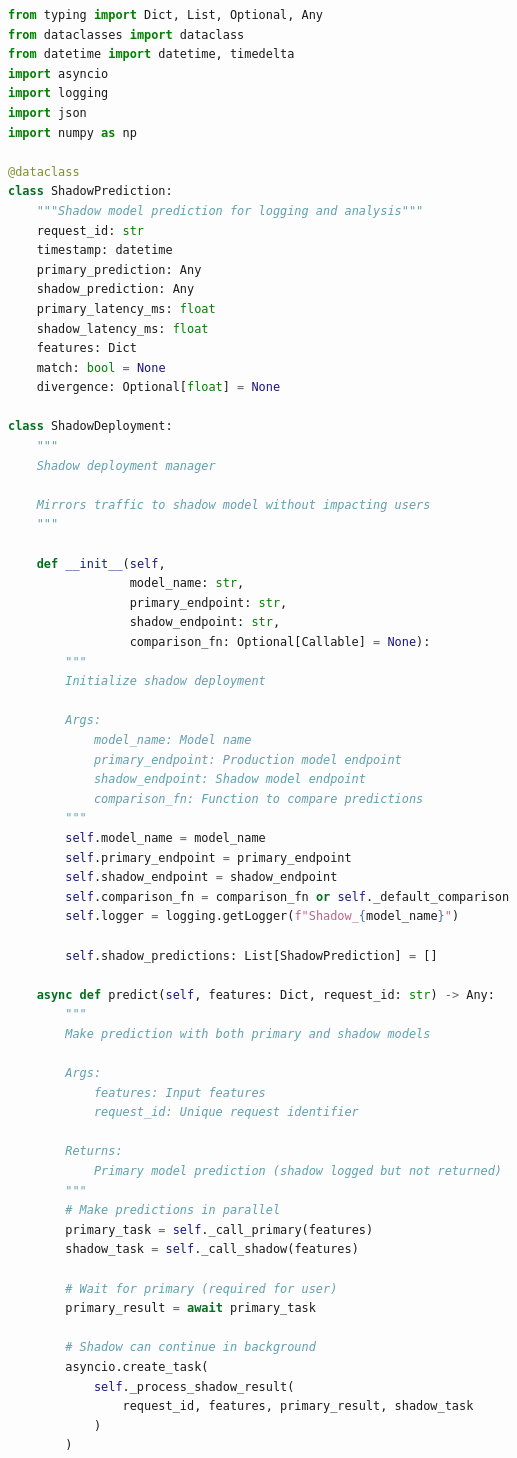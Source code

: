 \begin{lstlisting}[language=Python, caption=Shadow Deployment Manager]
from typing import Dict, List, Optional, Any
from dataclasses import dataclass
from datetime import datetime, timedelta
import asyncio
import logging
import json
import numpy as np

@dataclass
class ShadowPrediction:
    """Shadow model prediction for logging and analysis"""
    request_id: str
    timestamp: datetime
    primary_prediction: Any
    shadow_prediction: Any
    primary_latency_ms: float
    shadow_latency_ms: float
    features: Dict
    match: bool = None
    divergence: Optional[float] = None

class ShadowDeployment:
    """
    Shadow deployment manager

    Mirrors traffic to shadow model without impacting users
    """

    def __init__(self,
                 model_name: str,
                 primary_endpoint: str,
                 shadow_endpoint: str,
                 comparison_fn: Optional[Callable] = None):
        """
        Initialize shadow deployment

        Args:
            model_name: Model name
            primary_endpoint: Production model endpoint
            shadow_endpoint: Shadow model endpoint
            comparison_fn: Function to compare predictions
        """
        self.model_name = model_name
        self.primary_endpoint = primary_endpoint
        self.shadow_endpoint = shadow_endpoint
        self.comparison_fn = comparison_fn or self._default_comparison
        self.logger = logging.getLogger(f"Shadow_{model_name}")

        self.shadow_predictions: List[ShadowPrediction] = []

    async def predict(self, features: Dict, request_id: str) -> Any:
        """
        Make prediction with both primary and shadow models

        Args:
            features: Input features
            request_id: Unique request identifier

        Returns:
            Primary model prediction (shadow logged but not returned)
        """
        # Make predictions in parallel
        primary_task = self._call_primary(features)
        shadow_task = self._call_shadow(features)

        # Wait for primary (required for user)
        primary_result = await primary_task

        # Shadow can continue in background
        asyncio.create_task(
            self._process_shadow_result(
                request_id, features, primary_result, shadow_task
            )
        )


\end{lstlisting}
